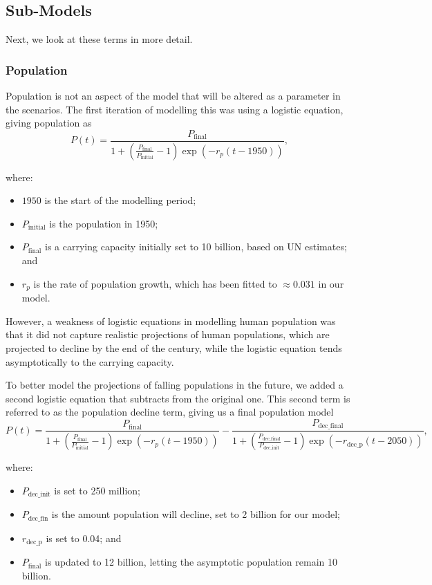 \documentclass[12pt]{article}
\newcommand{\fin}{\text{final}}
\newcommand{\init}{\text{initial}}
\newcommand{\wherevars}[1]{
where:
\vspace{-1ex}
\begingroup
\renewcommand{\labelitemi}{-}
\begin{itemize}
    \setlength\itemsep{-0.2ex}
	#1
\end{itemize}
\endgroup
}
\begin{document}
\subsection{Sub-Models}
Next, we look at these terms in more detail.

\subsubsection{Population}
Population is not an aspect of the model that will be altered as a parameter in the scenarios.
The first iteration of modelling this was using a logistic equation, giving population as
\begin{equation*}
	P(t) = \frac{P_\fin}{1 + (\frac{P_\fin}{P_\init}-1)\exp{(-r_p(t - 1950))}},
\end{equation*}
\wherevars{
	\item $1950$ is the start of the modelling period;
	\item $P_\init$ is the population in 1950;
	\item $P_\fin$ is a carrying capacity initially set to 10 billion, based on UN estimates\supercite{un_population_2024}; and
	\item $r_p$ is the rate of population growth, which has been fitted\supercite{our_code} to $\approx0.031$ in our model.
}
However, a weakness of logistic equations in modelling human population was that it did not capture realistic projections of human populations,
which are projected to decline by the end of the century\supercite{un_population_2024},
while the logistic equation tends asymptotically to the carrying capacity.

To better model the projections of falling populations in the future, we added a second logistic equation that subtracts from the original one.
This second term is referred to as the population decline term, giving us a final population model
\begin{equation}	\label{eq:population}
	P(t) = \frac{P_\fin}{1 + (\frac{P_\fin}{P_\init}-1)\exp{(-r_p(t - 1950))}}
			- \frac{P_\text{dec\_final}}{1 + (\frac{P_\text{dec\_final}}{P_\text{dec\_init}}-1)\exp{(-r_\text{dec\_p}(t - 2050))}},
\end{equation}
\wherevars{
	\item $P_\text{dec\_init}$ is set to 250 million;
	\item $P_\text{dec\_fin}$ is the amount population will decline, set to 2 billion for our model;
	\item $r_\text{dec\_p}$ is set to 0.04; and
	\item $P_\fin$ is updated to 12 billion, letting the asymptotic population remain 10 billion.
}
\end{document}
